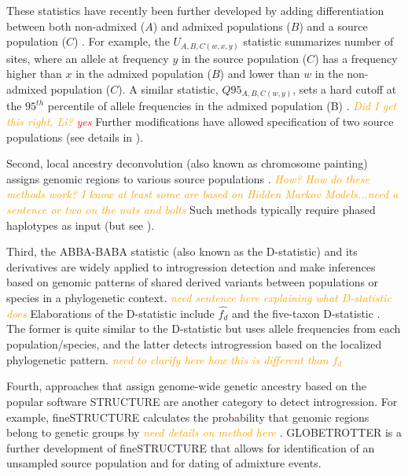 \documentclass[11pt]{article}
\newcommand{\mbh}[1]{\textcolor{orange}{ \emph{\scriptsize  #1}} } %
\newcommand{\lwang}[1]{\textcolor{red}{ \emph{\scriptsize  #1}} } %
\begin{document}
These statistics have recently been further developed by adding differentiation between both non-admixed ($A$) and admixed populations ($B$) and a source population ($C$) \cite{racimo2016}. 
For example, the $U_{A,B,C(w,x,y)}$ statistic summarizes number of sites, where an allele at frequency $y$ in the source population ($C$) has a frequency higher than $x$ in the admixed population ($B$) and lower than $w$ in the non-admixed population ($C$).
A similar statistic, $Q95_{A,B,C(w,y)}$, sets a hard cutoff at the $95^{th}$ percentile of allele frequencies in the admixed population (B) \cite{racimo2016}.
\mbh{Did I get this right, Li?} \lwang{yes}
Further modifications have allowed specification of two source populations (see details in \cite{racimo2016}).
 
Second, local ancestry deconvolution (also known as chromosome painting) assigns genomic regions to various source populations \cite{schraiber2015}. \mbh{How?  How do these methods work?  I know at least some are based on Hidden Markov Models...need a sentence or two on the nuts and bolts}
Such methods typically require phased haplotypes as input (but see \cite{churchhouse2013}).


Third, the ABBA-BABA statistic (also known as the D-statistic) and its derivatives are widely applied to introgression detection and make inferences based on genomic patterns of shared derived variants between populations or species in a phylogenetic context. \mbh{need sentence here explaining what D-statistic does} 
Elaborations of the D-statistic include $\hat{f_{d}}$ \cite{Martin2015} and the five-taxon D-statistic \cite{pease2015}. 
The former is quite similar to the D-statistic but uses allele frequencies from each population/species, and the latter detects introgression based on the localized phylogenetic pattern. \mbh{need to clarify here how this is different than $\hat{f_{d}}$}

Fourth, approaches that assign genome-wide genetic ancestry based on the popular software STRUCTURE \cite{pritchard2000} are another category to detect introgression. 
For example, fineSTRUCTURE \cite{Lawson2012} calculates the probability that genomic regions belong to genetic groups by \mbh{need details on method here}. 
GLOBETROTTER \cite{hellenthal2014} is a further development of fineSTRUCTURE that allows for identification of an unsampled source population and for dating of admixture events.
\end{document}
